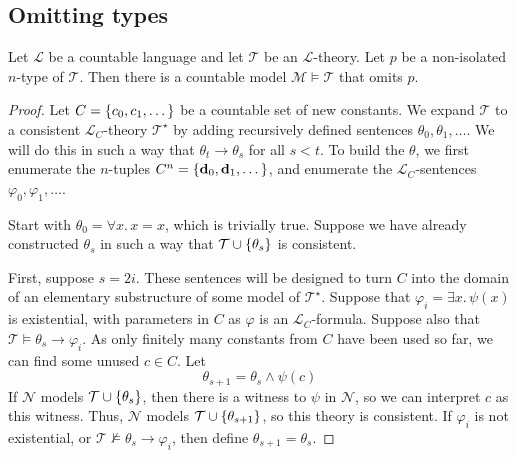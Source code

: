 \subsection{Omitting types}
\begin{theorem}
    Let \( \mathcal L \) be a countable language and let \( \mathcal T \) be an \( \mathcal L \)-theory.
    Let \( p \) be a non-isolated \( n \)-type of \( \mathcal T \).
    Then there is a countable model \( \mathcal M \vDash \mathcal T \) that omits \( p \).
\end{theorem}
\begin{proof}
    Let \( C = \qty{c_0, c_1, \dots} \) be a countable set of new constants.
    We expand \( \mathcal T \) to a consistent \( \mathcal L_C \)-theory \( \mathcal T^\star \) by adding recursively defined sentences \( \theta_0, \theta_1, \dots \).
    We will do this in such a way that \( \theta_t \to \theta_s \) for all \( s < t \).
    To build the \( \theta \), we first enumerate the \( n \)-tuples \( C^n = \qty{\vb d_0, \vb d_1, \dots} \), and enumerate the \( \mathcal L_C \)-sentences \( \varphi_0, \varphi_1, \dots \).

    Start with \( \theta_0 = \forall x.\, x = x \), which is trivially true.
    Suppose we have already constructed \( \theta_s \) in such a way that \( \mathcal T \cup \qty{\theta_s} \) is consistent.

    First, suppose \( s = 2i \).
    These sentences will be designed to turn \( C \) into the domain of an elementary substructure of some model of \( \mathcal T^\star \).
    Suppose that \( \varphi_i = \exists x.\, \psi(x) \) is existential, with parameters in \( C \) as \( \varphi \) is an \( \mathcal L_C \)-formula.
    Suppose also that \( \mathcal T \vDash \theta_s \to \varphi_i \).
    As only finitely many constants from \( C \) have been used so far, we can find some unused \( c \in C \).
    Let
    \[ \theta_{s + 1} = \theta_s \wedge \psi(c) \]
    If \( \mathcal N \) models \( \mathcal T \cup \qty{\theta_s} \), then there is a witness to \( \psi \) in \( \mathcal N \), so we can interpret \( c \) as this witness.
    Thus, \( \mathcal N \) models \( \mathcal T \cup \qty{\theta_{s+1}} \), so this theory is consistent.
    If \( \varphi_i \) is not existential, or \( \mathcal T \nvDash \theta_s \to \varphi_i \), then define \( \theta_{s + 1} = \theta_s \).


\end{proof}
